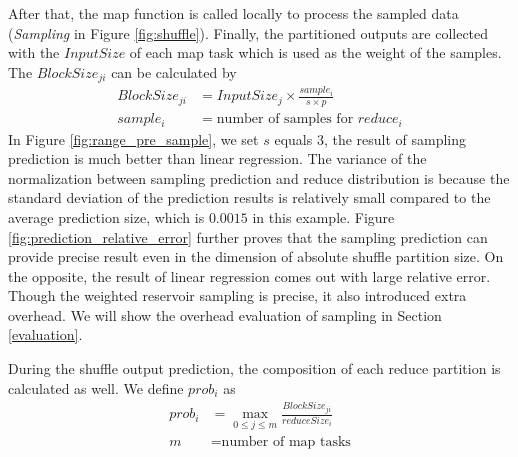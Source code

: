 \ifrevision
\reversemarginpar
{}
\fi
{}
After that, the map function is called locally to process the sampled data (\textit{Sampling} in Figure \ref{fig:shuffle}). 
Finally, the partitioned outputs are collected with the $InputSize$ of each map task which is used as the weight of the samples.
The $BlockSize_{ji}$ can be calculated by
\begin{equation}
\label{equationsample}
\begin{aligned}
	BlockSize_{ji} &= {{InputSize_j \times \frac{sample_i}{s \times p}}} \\
	sample_i &= \text{number of samples for $reduce_i$}
\end{aligned}
\end{equation}
In Figure \ref{fig:range_pre_sample}, we set $s$ equals $3$, the result of sampling prediction is much better than linear regression. 
The variance of the normalization between sampling prediction and reduce distribution is because the standard deviation of the prediction results is relatively small compared to the average prediction size, which is $0.0015$ in this example. 
Figure \ref{fig:prediction_relative_error} further proves that the sampling prediction can provide precise result even in the dimension of absolute shuffle partition size. 
On the opposite, the result of linear regression comes out with large relative error. 
Though the weighted reservoir sampling is precise, it also introduced extra overhead. 
We will show the overhead evaluation of sampling in Section \ref{evaluation}.

During the shuffle output prediction, the composition of each reduce partition is calculated as well. We define $prob_i$ as
\begin{equation}
\label{equationprob}
\begin{aligned}
	prob_i &= \max_{0 \leq j \leq m} \frac{BlockSize_{ji}}{reduceSize_i} \\
    m &= \text{number of map tasks}
\end{aligned}
\end{equation}

